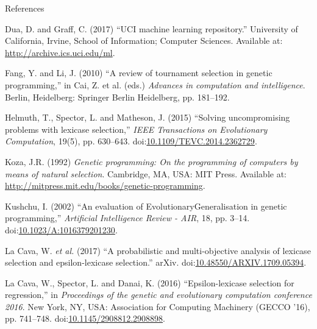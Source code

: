 \documentclass[
  ignorenonframetext,
]{beamer}
\newlength{\cslhangindent}
\newlength{\cslentryspacingunit} %
\newenvironment{CSLReferences}[2] %
 {%
  \setlength{\parindent}{0pt}
  \ifodd #1
  \let\oldpar\par
  \def\par{\hangindent=\cslhangindent\oldpar}
  \fi
  \setlength{\parskip}{#2\cslentryspacingunit}
 }%
 {}
\begin{document}
\begin{frame}[allowframebreaks]{References}
\hypertarget{refs}{}
\begin{CSLReferences}{0}{0}
\leavevmode{}%
Dua, D. and Graff, C. (2017) {``{UCI} machine learning repository.''}
University of California, Irvine, School of Information; Computer
Sciences. Available at: \url{http://archive.ics.uci.edu/ml}.

\leavevmode{}%
Fang, Y. and Li, J. (2010) {``A review of tournament selection in
genetic programming,''} in Cai, Z. et al. (eds.) \emph{Advances in
computation and intelligence}. Berlin, Heidelberg: Springer Berlin
Heidelberg, pp. 181--192.

\leavevmode{}%
Helmuth, T., Spector, L. and Matheson, J. (2015) {``Solving
uncompromising problems with lexicase selection,''} \emph{IEEE
Transactions on Evolutionary Computation}, 19(5), pp. 630--643.
doi:\href{https://doi.org/10.1109/TEVC.2014.2362729}{10.1109/TEVC.2014.2362729}.

\leavevmode{}%
Koza, J.R. (1992) \emph{Genetic programming: On the programming of
computers by means of natural selection}. Cambridge, MA, USA: MIT Press.
Available at: \url{http://mitpress.mit.edu/books/genetic-programming}.

\leavevmode{}%
Kushchu, I. (2002) {``An evaluation of EvolutionaryGeneralisation in
genetic programming,''} \emph{Artificial Intelligence Review - AIR}, 18,
pp. 3--14.
doi:\href{https://doi.org/10.1023/A:1016379201230}{10.1023/A:1016379201230}.

\leavevmode{}%
La Cava, W. \emph{et al.} (2017) {``A probabilistic and multi-objective
analysis of lexicase selection and epsilon-lexicase selection.''} arXiv.
doi:\href{https://doi.org/10.48550/ARXIV.1709.05394}{10.48550/ARXIV.1709.05394}.

\leavevmode{}%
La Cava, W., Spector, L. and Danai, K. (2016) {``Epsilon-lexicase
selection for regression,''} in \emph{Proceedings of the genetic and
evolutionary computation conference 2016}. New York, NY, USA:
Association for Computing Machinery (GECCO '16), pp. 741--748.
doi:\href{https://doi.org/10.1145/2908812.2908898}{10.1145/2908812.2908898}.


\end{CSLReferences}
\end{frame}
\end{document}

